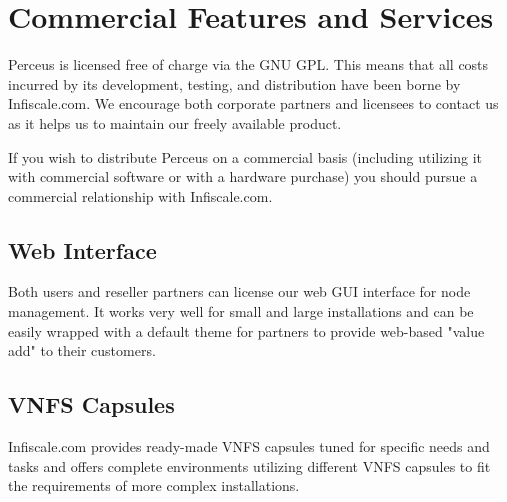 \documentclass[10pt,letterpaper]{report}
\begin{document}
\chapter{Commercial Features and Services}

Perceus is licensed free of charge via the GNU GPL.  This means that all costs
incurred by its development, testing, and distribution have been borne by
Infiscale.com.  We encourage both corporate partners and licensees to contact
us as it helps us to maintain our freely available product.

If you wish to distribute Perceus on a commercial basis (including utilizing
it with commercial software or with a hardware purchase) you should pursue a
commercial relationship with Infiscale.com.

\section{Web Interface}

Both users and reseller partners can license our web GUI interface for node
management.  It works very well for small and large installations and can be
easily wrapped with a default theme for partners to provide web-based "value
add" to their customers.

\section{VNFS Capsules}

Infiscale.com provides ready-made VNFS capsules tuned for specific needs and
tasks and offers complete environments utilizing different VNFS capsules to
fit the requirements of more complex installations.
\end{document}
